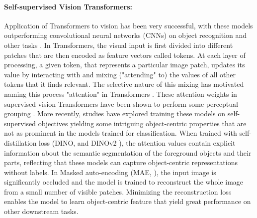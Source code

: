 \documentclass{article}
\begin{document}





\paragraph{Self-supervised Vision Transformers:}
Application of Transformers to vision has been very successful, with these models outperforming convolutional neural networks (CNNs) on object recognition and other tasks \citep{dosovitskiy2020image}. In Transformers, the visual input is first divided into different patches that are then encoded as feature vectors called tokens. At each layer of processing, a given token, that represents a particular image patch, updates its value by interacting with and mixing ("attending" to) the values of all other tokens that it finds relevant. The selective nature of this mixing has motivated naming this process "attention" in Transformers \citep{vaswani2017attention}. These attention weights in supervised vision Transformers have been shown to perform some perceptual grouping \citep{mehrani2023self}. More recently, studies have explored training these models on self-supervised objectives yielding some intriguing object-centric properties that are not as prominent in the models trained for classification. When trained with self-distillation loss (DINO, \cite{caron2021emerging} and DINOv2 \cite{oquab2023dinov2}), the attention values contain explicit information about the semantic segmentation of the foreground objects and their parts, reflecting that these models can capture object-centric representations without labels. In Masked auto-encoding (MAE, \cite{he2022masked}), the input image is significantly occluded and the model is trained to reconstruct the whole image from a small number of visible patches. Minimizing the reconstruction loss enables the model to learn object-centric feature that yield great performance on other downstream tasks. 
\end{document}
